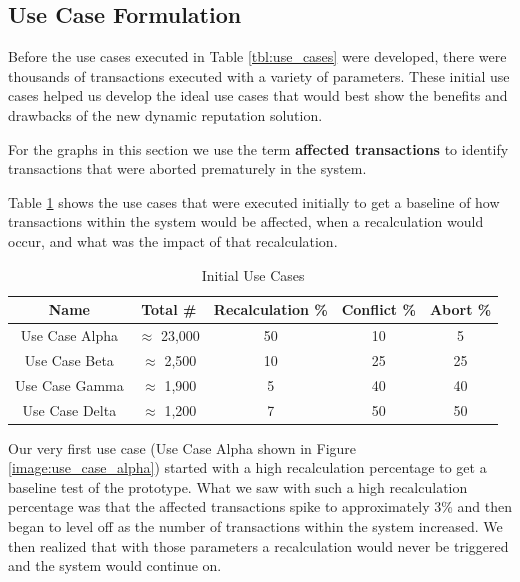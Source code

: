 \subsection{Use Case Formulation}

Before the use cases executed in Table \ref{tbl:use_cases} were developed, there were thousands of transactions executed with a variety of parameters. These initial use cases helped us develop the ideal use cases that would best show the benefits and drawbacks of the new dynamic reputation solution.

For the graphs in this section we use the term \textbf{affected transactions} to identify transactions that were aborted prematurely in the system.

Table \ref{tbl:use_cases_initial} shows the use cases that were executed initially to get a baseline of how transactions within the system would be affected, when a recalculation would occur, and what was the impact of that recalculation.

\begin{table}
\captionsetup{justification=centering}
\centering
 \begin{tabular}{|| c | c | c | c | c ||} 
 \hline
 \textbf{Name} & \textbf{Total \#} & \textbf{Recalculation \%} &  \textbf{Conflict \%} & \textbf{Abort \%} \\ [0.5ex] 
 \hline\hline
 Use Case Alpha & $\approx$ 23,000 & 50 & 10 & 5  \\ 
 \hline
 Use Case Beta & $\approx$ 2,500 & 10 & 25 & 25  \\ 
 \hline
 Use Case Gamma & $\approx$ 1,900 & 5 & 40 & 40  \\ 
 \hline
 Use Case Delta & $\approx$ 1,200 & 7 & 50 & 50  \\ 
 [1ex] 
 \hline
\end{tabular}
\caption{Initial Use Cases}
\label{tbl:use_cases_initial} %
\end{table}

Our very first use case (Use Case Alpha shown in Figure \ref{image:use_case_alpha}) started with a high recalculation percentage to get a baseline test of the prototype. What we saw with such a high recalculation percentage was that the affected transactions spike to approximately 3\% and then began to level off as the number of transactions within the system increased. We then realized that with those parameters a recalculation would never be triggered and the system would continue on.


